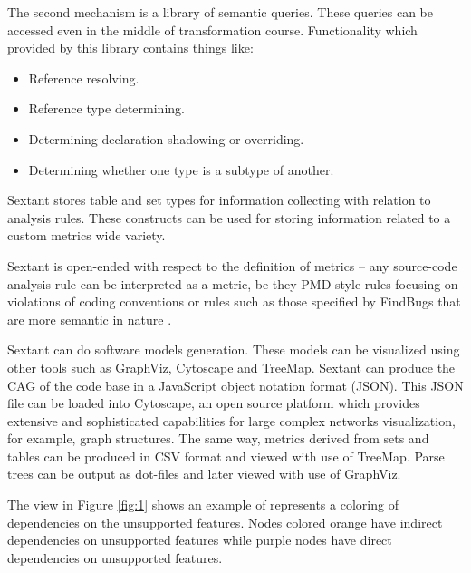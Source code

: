 The second mechanism is a library of semantic queries. These queries can be accessed even in the middle of transformation course. Functionality which provided by this library contains things like:
\begin{itemize}
	\item Reference resolving.
	\item Reference type determining.
	\item Determining declaration shadowing or overriding.
	\item Determining whether one type is a subtype of another.
\end{itemize}
 
Sextant stores table and set types for information collecting with relation to analysis rules. These constructs can be used for storing information related to a custom metrics wide variety.

Sextant is open-ended with respect to the definition of metrics – any source-code analysis rule can be interpreted as a metric, be they PMD-style rules focusing on violations of coding conventions or rules such as those specified by FindBugs that are more semantic in nature \cite{sextant}.

Sextant can do software models generation. These models can be visualized using other tools such as GraphViz, Cytoscape and TreeMap. Sextant can produce the CAG of the code base in a JavaScript object notation format (JSON). This JSON file can be loaded into Cytoscape, an open source platform which provides extensive and sophisticated capabilities for large complex networks visualization, for example, graph structures. The same way, metrics derived from sets and tables can be produced in CSV format and viewed with use of TreeMap. Parse trees can be output as dot-files and later viewed with use of GraphViz.

The view in Figure \ref{fig:1} shows an example of represents a coloring of dependencies on the unsupported features. Nodes colored orange have indirect dependencies on unsupported features while purple nodes have direct dependencies on unsupported features.

